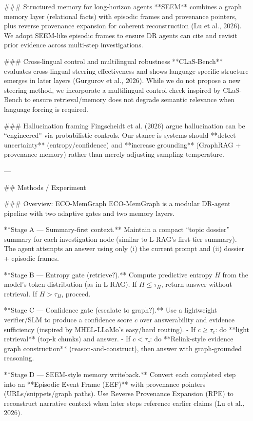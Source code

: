 ### Structured memory for long-horizon agents  
**SEEM** combines a graph memory layer (relational facts) with episodic frames and provenance pointers, plus reverse provenance expansion for coherent reconstruction (Lu et al., 2026). We adopt SEEM-like episodic frames to ensure DR agents can cite and revisit prior evidence across multi-step investigations.

### Cross-lingual control and multilingual robustness  
**CLaS-Bench** evaluates cross-lingual steering effectiveness and shows language-specific structure emerges in later layers (Gurgurov et al., 2026). While we do not propose a new steering method, we incorporate a multilingual control check inspired by CLaS-Bench to ensure retrieval/memory does not degrade semantic relevance when language forcing is required.

### Hallucination framing  
Fingscheidt et al. (2026) argue hallucination can be “engineered” via probabilistic controls. Our stance is systems should **detect uncertainty** (entropy/confidence) and **increase grounding** (GraphRAG + provenance memory) rather than merely adjusting sampling temperature.

---

## Methods / Experiment  

### Overview: ECO-MemGraph  
ECO-MemGraph is a modular DR-agent pipeline with two adaptive gates and two memory layers.

**Stage A — Summary-first context.**  
Maintain a compact “topic dossier” summary for each investigation node (similar to L-RAG’s first-tier summary). The agent attempts an answer using only (i) the current prompt and (ii) dossier + episodic frames.

**Stage B — Entropy gate (retrieve?).**  
Compute predictive entropy \(H\) from the model’s token distribution (as in L-RAG). If \(H \le \tau_H\), return answer without retrieval. If \(H > \tau_H\), proceed.

**Stage C — Confidence gate (escalate to graph?).**  
Use a lightweight verifier/SLM to produce a confidence score \(c\) over answerability and evidence sufficiency (inspired by MHEL-LLaMo’s easy/hard routing).  
- If \(c \ge \tau_c\): do **light retrieval** (top-k chunks) and answer.  
- If \(c < \tau_c\): do **Relink-style evidence graph construction** (reason-and-construct), then answer with graph-grounded reasoning.

**Stage D — SEEM-style memory writeback.**  
Convert each completed step into an **Episodic Event Frame (EEF)** with provenance pointers (URLs/snippets/graph paths). Use Reverse Provenance Expansion (RPE) to reconstruct narrative context when later steps reference earlier claims (Lu et al., 2026).

